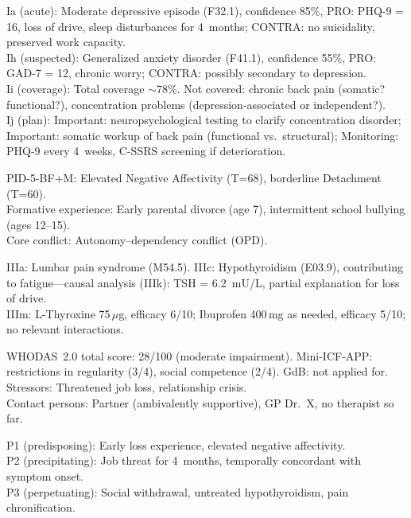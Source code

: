 \documentclass[11pt,a4paper]{article}
\begin{document}
\begin{description}[style=nextline, leftmargin=1.5cm, font=\bfseries\small]
\item[Axis~I (Mental Health Profiles)]
Ia (acute): Moderate depressive episode (F32.1), confidence 85\%, PRO: PHQ-9 = 16, loss of drive, sleep disturbances for 4~months; CONTRA: no suicidality, preserved work capacity. \\
Ih (suspected): Generalized anxiety disorder (F41.1), confidence 55\%, PRO: GAD-7 = 12, chronic worry; CONTRA: possibly secondary to depression. \\
Ii (coverage): Total coverage $\sim$78\%. Not covered: chronic back pain (somatic? functional?), concentration problems (depression-associated or independent?). \\
Ij (plan): Important: neuropsychological testing to clarify concentration disorder; Important: somatic workup of back pain (functional vs.\ structural); Monitoring: PHQ-9 every 4~weeks, C-SSRS screening if deterioration.
\item[Axis~II (Biography)]
PID-5-BF+M: Elevated Negative Affectivity (T=68), borderline Detachment (T=60). \\
Formative experience: Early parental divorce (age 7), intermittent school bullying (ages 12--15). \\
Core conflict: Autonomy--dependency conflict (OPD).
\item[Axis~III (Medical Synopsis)]
IIIa: Lumbar pain syndrome (M54.5). IIIc: Hypothyroidism (E03.9), contributing to fatigue---causal analysis (IIIk): TSH = 6.2~mU/L, partial explanation for loss of drive. \\
IIIm: L-Thyroxine 75\,$\mu$g, efficacy 6/10; Ibuprofen 400\,mg as needed, efficacy 5/10; no relevant interactions.
\item[Axis~IV (Environment \& Functioning)]
WHODAS~2.0 total score: 28/100 (moderate impairment). Mini-ICF-APP: restrictions in regularity (3/4), social competence (2/4). GdB: not applied for. \\
Stressors: Threatened job loss, relationship crisis. \\
Contact persons: Partner (ambivalently supportive), GP Dr.~X, no therapist so far.
\item[Axis~V (Condition Model)]
P1 (predisposing): Early loss experience, elevated negative affectivity. \\
P2 (precipitating): Job threat for 4~months, temporally concordant with symptom onset. \\
P3 (perpetuating): Social withdrawal, untreated hypothyroidism, pain chronification. \\

\end{description}
\end{document}

